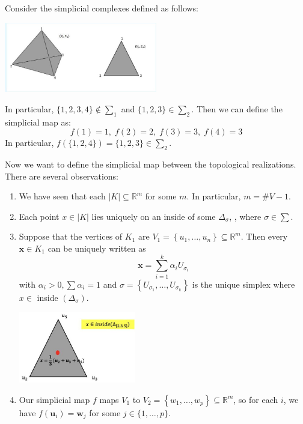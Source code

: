 \begin{example} Consider the simplicial complexes defined as follows:
\begin{center}
\includegraphics[width=0.5\textwidth]{images/Ch5_simplex_map.jpg}
\end{center}
In particular, \(\{ 1, 2, 3, 4\}  \notin  {\sum }_{1}\) and \(\{ 1, 2, 3\}  \in  {\sum }_{2}\). Then we can define the simplicial map as:
\[
f\left( 1\right)  = 1, \;f\left( 2\right)  = 2, \;f\left( 3\right)  = 3, \;f\left( 4\right)  = 3
\]
In particular, \(f\left( {\{ 1, 2, 4\} }\right)  = \{ 1, 2, 3\}  \in  {\sum }_{2}\).
\end{example}

Now we want to define the simplicial map between the topological realizations. There are several observations:
\begin{enumerate}
\item We have seen that each \(\left| K\right|  \subseteq  {\mathbb{R}}^{m}\) for some \(m\). In particular, \(m = \# V - 1\).

\item Each point \(x \in  \left| K\right|\) lies uniquely on an inside of some \({\Delta }_{\sigma }\), , where \(\sigma  \in  \sum\).

\item Suppose that the vertices of \({K}_{1}\) are \({V}_{1} = \left\{  {{u}_{1}, \ldots, {u}_{n}}\right\}   \subseteq  {\mathbb{R}}^{m}\). Then every \(\mathbf{x} \in  {K}_{1}\) can be uniquely written as
\[
\mathbf{x} = \mathop{\sum }\limits_{{i = 1}}^{k}{\alpha }_{i}{U}_{{\sigma }_{i}}
\]
with \({\alpha }_{i} > 0, \sum {\alpha }_{i} = 1\) and \(\sigma  = \left\{  {{U}_{{\sigma }_{1}}, \ldots, {U}_{{\sigma }_{k}}}\right\}\) is the unique simplex where \(x \in\) inside \(\left( {\Delta }_{\sigma }\right)\).
\begin{center}
\includegraphics[width=0.4\textwidth]{images/Ch5_inside_coords.jpg}
\end{center}
\item Our simplicial map \(f\) maps \({V}_{1}\) to \({V}_{2} = \left\{  {{w}_{1}, \ldots, {w}_{p}}\right\}   \subseteq  {\mathbb{R}}^{m}\), so for each \(i\), we have \(f\left( {\mathbf{u}}_{i}\right)  = {\mathbf{w}}_{j}\) for some \(j \in  \{ 1, \ldots, p\}.\)
\end{enumerate}

